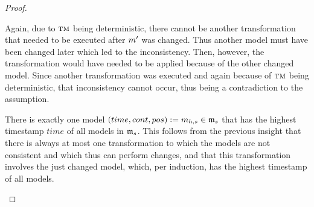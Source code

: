 \begin{proof}
\begin{properenumerate}
            Again, due to $\textsc{tm}$ being deterministic, there cannot be another transformation that needed to be executed after $m_{}'$ was changed. Thus another model must have been changed later which led to the inconsistency. Then, however, the transformation would have needed to be applied because of the other changed model.
            Since another transformation was executed and again because of $\textsc{tm}$ being deterministic, that inconsistency cannot occur, thus being a contradiction to the assumption.
        \item 
            There is exactly one model $(time,cont,pos) := m_{h,s} \in \mathfrak{m}_{s}$ that has the highest timestamp $time$ of all models in $\mathfrak{m}_{s}$.
            This follows from the previous insight that there is always at most one transformation to which the models are not consistent and which thus can perform changes, and that this transformation involves the just changed model, which, per induction, has the highest timestamp of all models.

\end{properenumerate}
\end{proof}
